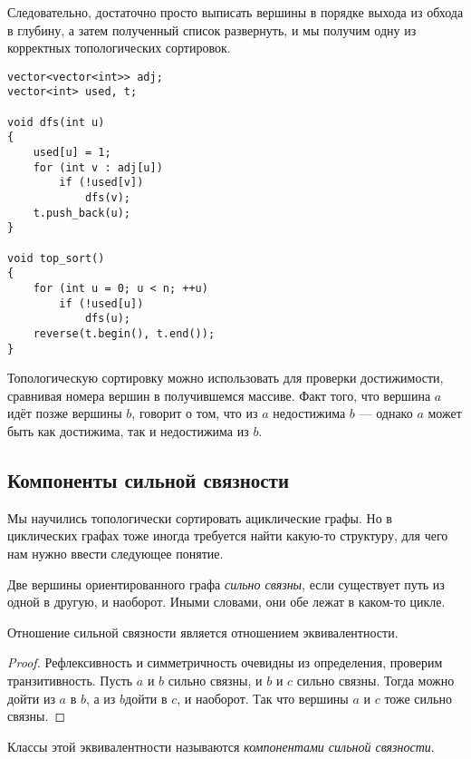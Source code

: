 Следовательно, достаточно просто выписать вершины в порядке выхода из обхода в глубину, а затем полученный список развернуть, и мы получим одну из корректных топологических сортировок.

\begin{verbatim}
vector<vector<int>> adj;
vector<int> used, t;

void dfs(int u)
{
    used[u] = 1;
    for (int v : adj[u])
        if (!used[v])
            dfs(v);
    t.push_back(u);
}

void top_sort()
{
    for (int u = 0; u < n; ++u)
        if (!used[u])
            dfs(u);
    reverse(t.begin(), t.end());
}
\end{verbatim}

Топологическую сортировку можно использовать для проверки достижимости, сравнивая номера вершин в получившемся массиве. Факт того, что вершина $a$ идёт позже вершины $b$, говорит о том, что из $a$ недостижима $b$ --- однако $a$ может быть как достижима, так и недостижима из $b$.

\subsection{Компоненты сильной связности}

Мы научились топологически сортировать ациклические графы. Но в циклических графах тоже иногда требуется найти какую-то структуру, для чего нам нужно ввести следующее понятие.

\begin{definition}
    Две вершины ориентированного графа \textit{сильно связны}, если существует путь из одной в другую, и наоборот. Иными словами, они обе лежат в каком-то цикле.
\end{definition}

\begin{statement}
    Отношение сильной связности является отношением эквивалентности.
\end{statement}

\begin{proof}
    Рефлексивность и симметричность очевидны из определения, проверим транзитивность. Пусть $a$ и $b$ сильно связны, и $b$ и $c$ сильно связны. Тогда можно дойти из $a$ в $b$, а из $b$дойти в $c$, и наоборот. Так что вершины $a$ и $c$ тоже сильно связны.
\end{proof}

\begin{definition}
    Классы этой эквивалентности называются \textit{компонентами сильной связности}.
\end{definition}

